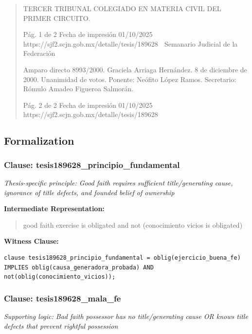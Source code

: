 \documentclass[11pt,a4paper]{article}
\begin{document}
\begin{quote}
TERCER TRIBUNAL COLEGIADO EN MATERIA CIVIL DEL PRIMER CIRCUITO.



                                             Pág. 1 de 2              Fecha de impresión 01/10/2025
  https://sjf2.scjn.gob.mx/detalle/tesis/189628
                                                  Semanario Judicial de la Federación


Amparo directo 8993/2000. Graciela Arriaga Hernández. 8 de diciembre de 2000. Unanimidad de
votos. Ponente: Neófito López Ramos. Secretario: Rómulo Amadeo Figueroa Salmorán.




                                             Pág. 2 de 2       Fecha de impresión 01/10/2025
  https://sjf2.scjn.gob.mx/detalle/tesis/189628

\end{quote}

\subsection{Formalization}

\subsubsection{Clause: tesis189628\_principio\_fundamental}

\textit{Thesis-specific principle: Good faith requires sufficient title/generating cause, ignorance of title defects, and founded belief of ownership}

\textbf{Intermediate Representation:}

\begin{quote}
good faith exercise is obligated and not (conocimiento vicios is obligated)
\end{quote}

\textbf{Witness Clause:}

\begin{lstlisting}[style=witnessstyle, language=Witness]
clause tesis189628_principio_fundamental = oblig(ejercicio_buena_fe) IMPLIES oblig(causa_generadora_probada) AND not(oblig(conocimiento_vicios));
\end{lstlisting}

\subsubsection{Clause: tesis189628\_mala\_fe}

\textit{Supporting logic: Bad faith possessor has no title/generating cause OR knows title defects that prevent rightful possession}
\end{document}
